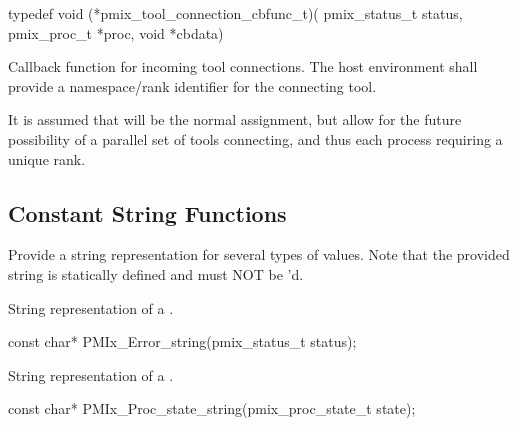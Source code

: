 \format

\cspecificstart
\begin{codepar}
typedef void (*pmix_tool_connection_cbfunc_t)(
                             pmix_status_t status,
                             pmix_proc_t *proc, void *cbdata)
\end{codepar}
\cspecificend

\begin{arglist}
\end{arglist}

\descr

Callback function for incoming tool connections.
The host environment shall provide a namespace/rank identifier for the connecting tool.

\advicermstart
It is assumed that  will be the normal assignment, but allow for the future possibility of a parallel set of tools connecting, and thus each process requiring a unique rank.
\advicermend

\subsection{Constant String Functions}

Provide a string representation for several types of values.
Note that the provided string is statically defined and must NOT be 'd.

\summary
{}

String representation of a .

\cspecificstart
\begin{codepar}
const char*
PMIx_Error_string(pmix_status_t status);
\end{codepar}
\cspecificend

\summary
{}

String representation of a .

\cspecificstart
\begin{codepar}
const char*
PMIx_Proc_state_string(pmix_proc_state_t state);
\end{codepar}
\cspecificend

\summary
{}

